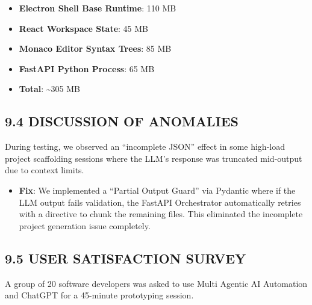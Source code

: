 \documentclass[
  12pt,
]{article}
\providecommand{\tightlist}{%
  \setlength{\itemsep}{0pt}\setlength{\parskip}{0pt}}
\begin{document}
\begin{itemize}
\tightlist
\item
  \textbf{Electron Shell Base Runtime}: 110 MB
\item
  \textbf{React Workspace State}: 45 MB
\item
  \textbf{Monaco Editor Syntax Trees}: 85 MB
\item
  \textbf{FastAPI Python Process}: 65 MB
\item
  \textbf{Total}: \textasciitilde305 MB
\end{itemize}

\subsection{9.4 DISCUSSION OF ANOMALIES}\label{discussion-of-anomalies}

During testing, we observed an ``incomplete JSON'' effect in some
high-load project scaffolding sessions where the LLM's response was
truncated mid-output due to context limits.

\begin{itemize}
\tightlist
\item
  \textbf{Fix}: We implemented a ``Partial Output Guard'' via Pydantic
  where if the LLM output fails validation, the FastAPI Orchestrator
  automatically retries with a directive to chunk the remaining files.
  This eliminated the incomplete project generation issue completely.
\end{itemize}

\subsection{9.5 USER SATISFACTION
SURVEY}\label{user-satisfaction-survey}

A group of 20 software developers was asked to use Multi Agentic AI
Automation and ChatGPT for a 45-minute prototyping session.
\end{document}
